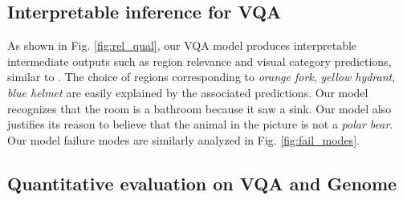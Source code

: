 \documentclass[10pt,twocolumn,letterpaper]{article}
\begin{document}
\subsection{Interpretable inference for VQA}
As shown in Fig. \ref{fig:rel_qual}, our VQA model produces interpretable intermediate outputs such as region relevance and visual category predictions, similar to \cite{tommasi2016bmvc}. The choice of regions corresponding to \textit{orange fork}, \textit{yellow hydrant}, \textit{blue helmet} are easily explained by the associated predictions. Our model recognizes that the room is a bathroom because it saw a sink. Our model also justifies its reason to believe that the animal in the picture is not a \textit{polar bear}. Our model failure modes are similarly analyzed in Fig. \ref{fig:fail_modes}.

\subsection{Quantitative evaluation on VQA and Genome}\label{sec:vqa_eval}
\end{document}
